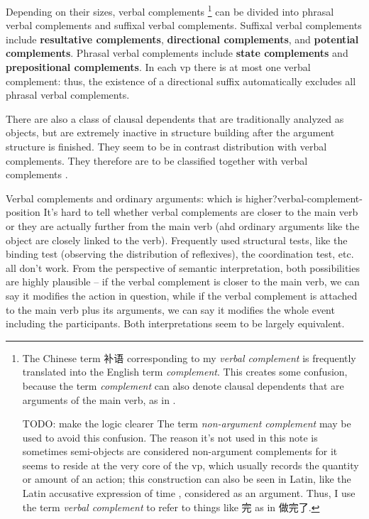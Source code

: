 \documentclass[UTF8, a4paper, oneside, scheme=plain, 12pt]{ctexrep}
\newcommand*{\citesec}[1]{\S~{#1}}
\newcommand*{\citepages}[1]{pp.~{#1}}
\newcommand*{\concept}[1]{\textbf{#1}}
\newcommand*{\term}[1]{\emph{#1}}
\begin{document}
Depending on their sizes, 
verbal complements%
\footnote{
    The Chinese term 补语 corresponding to my \term{verbal complement}
    is frequently translated into the English term \term{complement}.
    This creates some confusion,
    because the term \term{complement} can also denote 
    clausal dependents that are arguments of the main verb, as in \citet{cgel}.

    TODO: make the logic clearer
    The term \term{non-argument complement} may be used to avoid this confusion.
    The reason it's not used in this note is 
    sometimes semi-objects are considered non-argument complements
    for it seems to reside at the very core of the \acs{vp},
    which usually records the quantity or amount of an action;
    this construction can also be seen in Latin, 
    like the Latin accusative expression of time \citep[\citesec{423}]{greenough2013allen},
    considered as an argument.
    Thus, I use the term \term{verbal complement} to refer to 
    things like 完 as in 做完了.
}
can be divided into 
phrasal verbal complements 
and suffixal verbal complements. 
Suffixal verbal complements 
include \concept{resultative complements}, 
\concept{directional complements}, 
and \concept{potential complements}. 
Phrasal verbal complements include \concept{state complements} and 
\concept{prepositional complements}.
In each \acs{vp} there is at most one verbal complement: 
thus, the existence of a directional suffix
automatically excludes all phrasal verbal complements.

There are also a class of clausal dependents 
that are traditionally analyzed as objects,
but are extremely inactive in structure building 
after the argument structure is finished.
They seem to be in contrast distribution with verbal complements.
They therefore are to be classified together with verbal complements
\citep[\citepages{188-190}]{deng2010formal}.

\begin{infobox}{Verbal complements and ordinary arguments: which is higher?}{verbal-complement-position}
    It's hard to tell whether verbal complements are closer to the main verb 
    or they are actually further from the main verb 
    (ahd ordinary arguments like the object are closely linked to the verb).
    Frequently used structural tests, 
    like the binding test (observing the distribution of reflexives),
    the coordination test, etc. all don't work. 
    From the perspective of semantic interpretation, 
    both possibilities are highly plausible -- 
    if the verbal complement is closer to the main verb,
    we can say it modifies the action in question,
    while if the verbal complement is attached to the main verb plus its arguments,
    we can say it modifies the whole event including the participants.
    Both interpretations seem to be largely equivalent.
\end{infobox}
\end{document}
